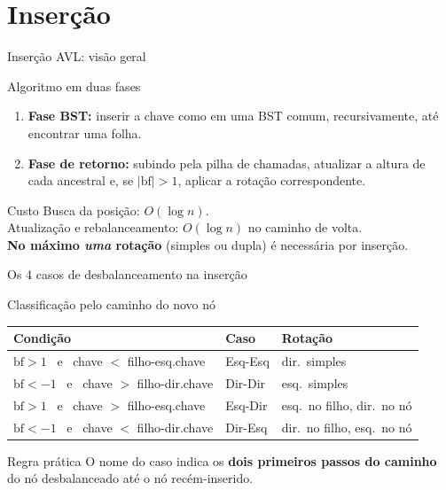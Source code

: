 \documentclass[aspectratio=169]{beamer}
\begin{document}
\section{Inserção}

\begin{frame}{Inserção AVL: visão geral}
  \begin{block}{Algoritmo em duas fases}
    \begin{enumerate}
      \item \textbf{Fase BST:} inserir a chave como em uma BST comum,
            recursivamente, até encontrar uma folha.
      \item \textbf{Fase de retorno:} subindo pela pilha de chamadas,
            atualizar a altura de cada ancestral e, se $|\mathrm{bf}| > 1$,
            aplicar a rotação correspondente.
    \end{enumerate}
  \end{block}
  \begin{exampleblock}{Custo}
    Busca da posição: $O(\log n)$.\\
    Atualização e rebalanceamento: $O(\log n)$ no caminho de volta.\\
    \textbf{No máximo \emph{uma} rotação} (simples ou dupla) é
    necessária por inserção.
  \end{exampleblock}
\end{frame}

\begin{frame}{Os 4 casos de desbalanceamento na inserção}
  \begin{block}{Classificação pelo caminho do novo nó}
  \centering
  \begin{tabular}{lll}
    \toprule
    Condição & Caso & Rotação \\
    \midrule
    $\mathrm{bf}>1$ \ e \ chave $<$ filho-esq.chave   & Esq-Esq & dir.\ simples \\
    $\mathrm{bf}<-1$ \ e \ chave $>$ filho-dir.chave  & Dir-Dir & esq.\ simples \\
    $\mathrm{bf}>1$ \ e \ chave $>$ filho-esq.chave   & Esq-Dir & esq.\ no filho, dir.\ no nó \\
    $\mathrm{bf}<-1$ \ e \ chave $<$ filho-dir.chave  & Dir-Esq & dir.\ no filho, esq.\ no nó \\
    \bottomrule
  \end{tabular}
  \end{block}
  \begin{exampleblock}{Regra prática}
    O nome do caso indica os \textbf{dois primeiros passos do caminho}
    do nó desbalanceado até o nó recém-inserido.
  \end{exampleblock}
\end{frame}
\end{document}
